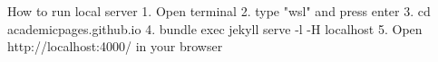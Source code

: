 How to run local server
1. Open terminal
2. type "wsl" and press enter
3. cd academicpages.github.io
4. bundle exec jekyll serve -l -H localhost
5. Open http://localhost:4000/ in your browser